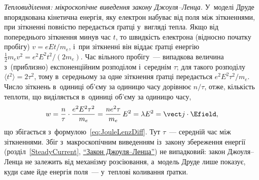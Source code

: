 \emph{Тепловиділення: мікроскопічне виведення закону Джоуля--Ленца.} У~моделі Друде
впорядкована кінетична енергія, яку електрон набуває від поля між зіткненнями, при
зіткненні повністю передається ґратці у~вигляді тепла. Якщо від попереднього зіткнення
минув час $t$, то швидкість електрона (відносно початку пробігу) $v=eEt/m_e$, і~при
зіткненні він віддає ґратці енергію $\tfrac12m_ev^2=e^2E^2t^2/(2m_e)$. Час вільного
пробігу~--- випадкова величина з~(приблизно) експоненційним розподілом і~середнім $\tau$;
для такого розподілу $\langle t^2\rangle=2\tau^2$, тому в~середньому за одне зіткнення
ґратці передається $e^2E^2\tau^2/m_e$. Число зіткнень в~одиниці об'єму за одиницю часу
дорівнює $n/\tau$, отже, кількість теплоти, що виділяється в~одиниці об'єму за одиницю
часу,
\begin{equation*}
	w=\frac n\tau\cdot\frac{e^2E^2\tau^2}{m_e}=\frac{ne^2\tau}{m_e}\,E^2=\lambda E^2=\vect j\cdot\Efield,
\end{equation*}
що збігається з~формулою~\eqref{eq:JouleLenzDiff}. Тут $\tau$~--- середній час між
зіткненнями. Збіг з~макроскопічним виведенням із~закону збереження енергії
(розділ~\ref{SteadyCurrent}, \hyperlink{joule-lenz-law}{\enquote{Закон
Джоуля--Ленца}}) не випадковий: закон Джоуля--Ленца не залежить від механізму розсіювання,
а~модель Друде лише показує, куди саме йде енергія поля~--- у~теплові коливання ґратки.

